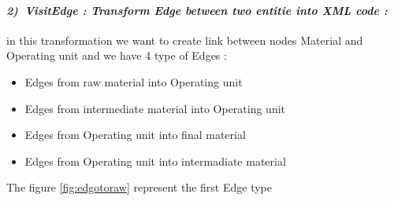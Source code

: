 \paragraph{\emph{2)~VisitEdge : Transform Edge between two entitie into XML code :} } in this transformation we want to create link between nodes Material and Operating unit 
and we have 4 type of Edges : 
\begin{itemize}

\newcommand{\localtextbulletone}{\textcolor{gray}{\raisebox{.45ex}{\rule{.6ex}{.6ex}}}}
\renewcommand{\labelitemi}{\localtextbulletone}
	\item Edges from raw material into Operating unit
	\item Edges from intermediate material into Operating unit
	
	\item Edges from Operating unit into final material
	\item Edges from Operating unit into intermadiate material 
\end{itemize}
The figure \ref{fig:edgotoraw} represent the first Edge type 
\vspace{1cm}
